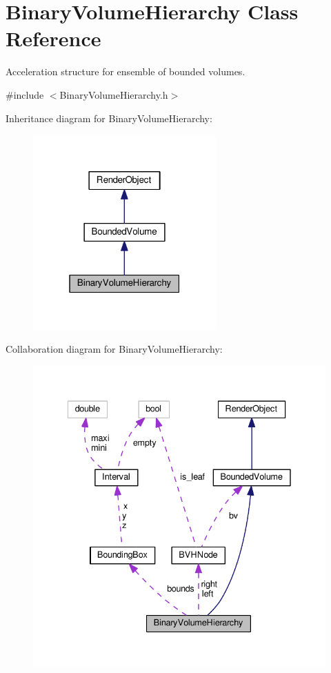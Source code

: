 \hypertarget{classBinaryVolumeHierarchy}{}\section{Binary\+Volume\+Hierarchy Class Reference}
\label{classBinaryVolumeHierarchy}


Acceleration structure for ensemble of bounded volumes.  




{\ttfamily \#include $<$Binary\+Volume\+Hierarchy.\+h$>$}



Inheritance diagram for Binary\+Volume\+Hierarchy\+:\nopagebreak
\begin{figure}[H]
\begin{center}
\leavevmode
\includegraphics[width=199pt]{classBinaryVolumeHierarchy__inherit__graph}
\end{center}
\end{figure}


Collaboration diagram for Binary\+Volume\+Hierarchy\+:\nopagebreak
\begin{figure}[H]
\begin{center}
\leavevmode
\includegraphics[width=335pt]{classBinaryVolumeHierarchy__coll__graph}
\end{center}
\end{figure}
